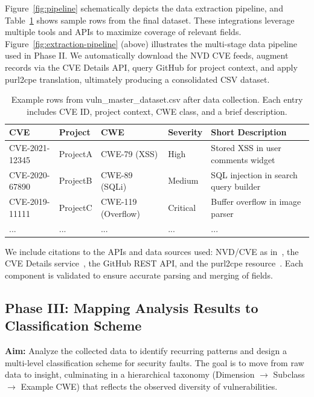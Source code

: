 Figure~\ref{fig:pipeline} schematically depicts the data extraction pipeline, and Table~\ref{tab:vuln-dataset} shows sample rows from the final dataset. These integrations leverage multiple tools and APIs to maximize coverage of relevant fields. 
Figure~\ref{fig:extraction-pipeline} (above) illustrates the multi-stage data pipeline used in Phase II. We automatically download the NVD CVE feeds, augment records via the CVE Details API, query GitHub for project context, and apply purl2cpe translation, ultimately producing a consolidated CSV dataset. 

\begin{table}[h!]
\centering
\caption{Example rows from vuln\_master\_dataset.csv after data collection. Each entry includes CVE ID, project context, CWE class, and a brief description.}
\label{tab:vuln-dataset}
\begin{tabular}{llllp{4cm}}
\hline
\textbf{CVE} & \textbf{Project} & \textbf{CWE} & \textbf{Severity} & \textbf{Short Description} \\
\hline
CVE-2021-12345 & ProjectA & CWE-79 (XSS) & High & Stored XSS in user comments widget \\
CVE-2020-67890 & ProjectB & CWE-89 (SQLi) & Medium & SQL injection in search query builder \\
CVE-2019-11111 & ProjectC & CWE-119 (Overflow) & Critical & Buffer overflow in image parser \\
... & ... & ... & ... & ... \\
\hline
\end{tabular}
\end{table}

We include citations to the APIs and data sources used: NVD/CVE as in~\cite{nvd_nist}, the CVE Details service~\cite{cve_details}, the GitHub REST API, and the purl2cpe resource~. Each component is validated to ensure accurate parsing and merging of fields.

\subsection{Phase III: Mapping Analysis Results to Classification Scheme} \textbf{Aim:} Analyze the collected data to identify recurring patterns and design a multi-level classification scheme for security faults. The goal is to move from raw data to insight, culminating in a hierarchical taxonomy (Dimension $\rightarrow$ Subclass $\rightarrow$ Example CWE) that reflects the observed diversity of vulnerabilities.
\newline


